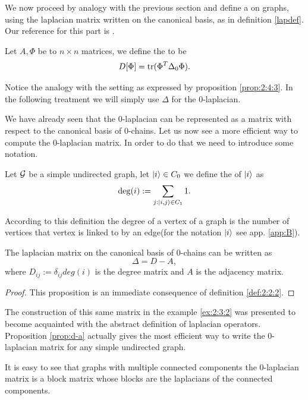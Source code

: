 \documentclass[../2.tex]{subfiles}
\begin{document}
We now proceed by analogy with the previous section and define a  on graphs, using the laplacian matrix written on the canonical basis, as
in definition \ref{lapdef}.
Our reference for this part is \cite{bronstein}.

\begin{defn}
    Let $A,\Phi$ be to $n\times n$ matrices, we define the  to be 
    \[ D[\Phi] = \operatorname{tr}(\Phi^T \Delta_0 \Phi). \]
\end{defn}

Notice the analogy with the setting as expressed by proposition \ref{prop:2:4:3}.
In the following treatment we will simply use $\Delta$ for the $0$-laplacian.

We have already seen that the $0$-laplacian can be represented as a matrix with respect to the canonical basis
of $0$-chains. Let us now see a more efficient way to compute the $0$-laplacian matrix. In order to do that we need to introduce some notation.

\begin{defn}
    Let $\mathcal{G}$ be a simple undirected graph, let $| i \rangle \in C_0$ we define the  of $| i \rangle$ as 
    \[ \operatorname{deg}(i) := \sum_{j : | i,j \rangle \in C_1} 1. \]
\end{defn}

According to this definition the degree of a vertex of a graph is the number of vertices that vertex is linked to by an edge(for the notation $| i \rangle$ see app. \ref{app:B}).

\begin{prop}
    The laplacian matrix on the canonical basis of $0$-chains can be written as
    \[ \Delta = D - A, \]
    where $D_{ij} := \delta_{ij}deg(i)$ is the degree matrix and $A$ is the adjacency matrix.
    \label{prop:d-a}
\end{prop}
\begin{proof}
    This proposition is an immediate consequence of definition \ref{def:2:2:2}. \qedhere
\end{proof}

The construction of this same matrix in the example \ref{ex:2:3:2} was presented to become acquainted with the abstract definition of laplacian operators.
Proposition \ref{prop:d-a} actually gives the most efficient way to write the $0$-laplacian matrix for any simple undirected graph.

It is easy to see that graphs with multiple connected components the $0$-laplacian matrix is a block matrix whose blocks are the laplacians of the connected components.
\end{document}
